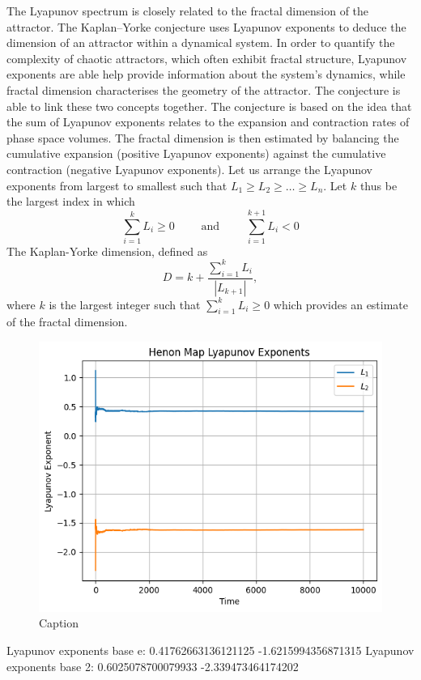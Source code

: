 The Lyapunov spectrum is closely related to the fractal dimension of the attractor. The Kaplan–Yorke conjecture uses Lyapunov exponents to deduce the dimension of an attractor within a dynamical system. In order to quantify the complexity of chaotic attractors, which often exhibit fractal structure, Lyapunov exponents are able help provide information about the system's dynamics, while fractal dimension characterises the geometry of the attractor. The conjecture is able to link these two concepts together. The conjecture is based on the idea that the sum of Lyapunov exponents relates to the expansion and contraction rates of phase space volumes. The fractal dimension is then estimated by balancing the cumulative expansion (positive Lyapunov exponents) against the cumulative contraction (negative Lyapunov exponents). Let us arrange the Lyapunov exponents from largest to smallest such that $L_1 \geq L_2 \geq \dots \geq L_n$. Let $k$ thus be the largest index in which
$$
\sum_{i=1}^k L_i\geq 0 \quad\quad \text{ and } \quad \quad \sum_{i=1}^{k+1} L_i <0
$$
The Kaplan-Yorke dimension, defined as
$$
D = k + \frac{\sum_{i=1}^k L_i}{|L_{k+1}|},
$$
where $k$ is the largest integer such that $\sum_{i=1}^k L_i \geq 0$ which provides an estimate of the fractal dimension.

\begin{exmp}
    \begin{figure}
        \centering
        \includegraphics[width=0.95\linewidth]{Bifurcation Images/lyapunov_henon.png}
        \caption{Caption}
        \label{fig:lyapunov_henon}
    \end{figure}
    Lyapunov exponents base e: 0.41762663136121125 -1.6215994356871315
    Lyapunov exponents base 2: 0.6025078700079933 -2.339473464174202
\end{exmp}

